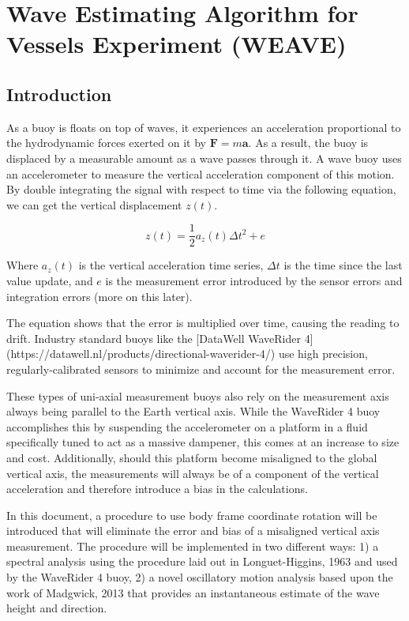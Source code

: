 \chapter{Wave Estimating Algorithm for Vessels Experiment (WEAVE)} \label{chap:weave}

\section{Introduction} \label{sec:weave_intro}

As a buoy is floats on top of waves, it experiences an acceleration proportional to the hydrodynamic forces exerted on it by $\pmb{F} = m\pmb{a}$. 
As a result, the buoy is displaced by a measurable amount as a wave passes through it. 
A wave buoy uses an accelerometer to measure the vertical acceleration component of this motion. 
By double integrating the signal with respect to time via the following equation, we can get the vertical displacement $z(t)$.

\begin{equation}
    z(t) = \frac{1}{2} a_z(t) \Delta t^2 + e
\end{equation}

Where $a_z(t)$ is the vertical acceleration time series, $\Delta t$ is the time since the last value update, and $e$ is the measurement error introduced by the sensor errors and integration errors (more on this later).

The equation shows that the error is multiplied over time, causing the reading to drift. 
Industry standard buoys like the [DataWell WaveRider 4](https://datawell.nl/products/directional-waverider-4/) use high precision, regularly-calibrated sensors to minimize and account for the measurement error.

These types of uni-axial measurement buoys also rely on the measurement axis always being parallel to the Earth vertical axis. 
While the WaveRider 4 buoy accomplishes this by suspending the accelerometer on a platform in a fluid specifically tuned to act as a massive dampener, this comes at an increase to size and cost. 
Additionally, should this platform become misaligned to the global vertical axis, the measurements will always be of a component of the vertical acceleration and therefore introduce a bias in the calculations.

In this document, a procedure to use body frame coordinate rotation will be introduced that will eliminate the error and bias of a misaligned vertical axis measurement. 
The procedure will be implemented in two different ways: 1) a spectral analysis using the procedure laid out in Longuet-Higgins, 1963 and used by the WaveRider 4 buoy, 2) a novel oscillatory motion analysis based upon the work of Madgwick, 2013 that provides an instantaneous estimate of the wave height and direction.

